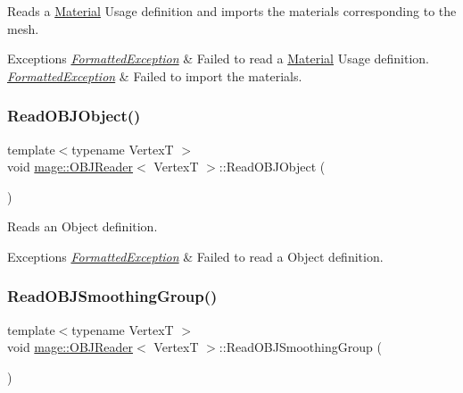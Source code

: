 Reads a \hyperlink{classmage_1_1_material}{Material} Usage definition and imports the materials corresponding to the mesh.


\begin{DoxyExceptions}{Exceptions}
{\em \hyperlink{classmage_1_1_formatted_exception}{Formatted\+Exception}} & Failed to read a \hyperlink{classmage_1_1_material}{Material} Usage definition. \\
\hline
{\em \hyperlink{classmage_1_1_formatted_exception}{Formatted\+Exception}} & Failed to import the materials. \\
\hline
\end{DoxyExceptions}
\hypertarget{classmage_1_1_o_b_j_reader_afc3f17024a006cce3b7869ca8c6a8f07}{}\label{classmage_1_1_o_b_j_reader_afc3f17024a006cce3b7869ca8c6a8f07} 
\subsubsection{\texorpdfstring{Read\+O\+B\+J\+Object()}{ReadOBJObject()}}
{\footnotesize\ttfamily template$<$typename VertexT $>$ \\
void \hyperlink{classmage_1_1_o_b_j_reader}{mage\+::\+O\+B\+J\+Reader}$<$ VertexT $>$\+::Read\+O\+B\+J\+Object (\begin{DoxyParamCaption}{ }\end{DoxyParamCaption})\hspace{0.3cm}{\ttfamily [private]}}

Reads an Object definition.


\begin{DoxyExceptions}{Exceptions}
{\em \hyperlink{classmage_1_1_formatted_exception}{Formatted\+Exception}} & Failed to read a Object definition. \\
\hline
\end{DoxyExceptions}
\hypertarget{classmage_1_1_o_b_j_reader_a2dd830c506ffbfbcd932b9bf75a35c56}{}\label{classmage_1_1_o_b_j_reader_a2dd830c506ffbfbcd932b9bf75a35c56} 
\subsubsection{\texorpdfstring{Read\+O\+B\+J\+Smoothing\+Group()}{ReadOBJSmoothingGroup()}}
{\footnotesize\ttfamily template$<$typename VertexT $>$ \\
void \hyperlink{classmage_1_1_o_b_j_reader}{mage\+::\+O\+B\+J\+Reader}$<$ VertexT $>$\+::Read\+O\+B\+J\+Smoothing\+Group (\begin{DoxyParamCaption}{ }\end{DoxyParamCaption})\hspace{0.3cm}{\ttfamily [private]}}

